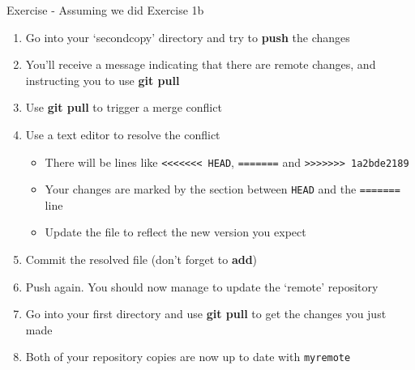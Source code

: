 \documentclass{beamer}
\begin{document}
\begin{frame}
  \begin{block}{Exercise - Assuming we did Exercise 1b}
    \begin{enumerate}
      \item Go into your \lq{}secondcopy\rq{} directory and try to \textbf{push} the changes
      \item You\rq{}ll receive a message indicating that there are remote changes, and instructing you to use \textbf{git pull}
      \item Use \textbf{git pull} to trigger a merge conflict
      \item Use a text editor to resolve the conflict
      \begin{itemize}
        \item There will be lines like \texttt{<<<<<<< HEAD}, \texttt{=======} and \texttt{>>>>>>> 1a2bde2189}
        \item Your changes are marked by the section between \texttt{HEAD} and the \texttt{=======} line
        \item Update the file to reflect the new version you expect
      \end{itemize}
      \item Commit the resolved file (don\rq{}t forget to \textbf{add})
      \item Push again. You should now manage to update the \lq{}remote\rq{} repository
      \item Go into your first directory and use \textbf{git pull} to get the changes you just made
      \item Both of your repository copies are now up to date with \texttt{myremote}
    \end{enumerate}
  \end{block}
\end{frame}
\end{document}
